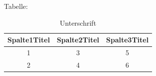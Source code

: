 Tabelle:
\begin{table}[H]
	\centering
	\begin{tabular}{c|c|c}
		\toprule 
		Spalte1Titel  & Spalte2Titel & Spalte3Titel \\ \midrule 
		1 & 3 &  5  \\ %
		2 & 4 &  6  \\ %
	\end{tabular}
	\caption{Unterschrift}
	\label{tab:label42}
\end{table}

\begin{center}
	\begin{minipage}{\textwidth}
		
	\end{minipage}
\end{center}






